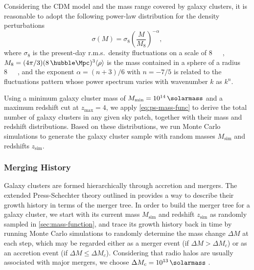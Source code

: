 \documentclass[modern]{aastex62}
\newcommand{\R}[1]{\mathrm{#1}}
\begin{document}
Considering the CDM model and the mass range covered by galaxy clusters,
it is reasonable to adopt the following power-law distribution for the
density perturbations \citep{sarazin2002,randall2002}
\begin{equation}
  \label{eq:sigma-mass}
  \sigma(M) = \sigma_8 \left( \frac{M}{M_8} \right)^{-\alpha},
\end{equation}
where $\sigma_8$ is the present-day r.m.s.\ density fluctuations on
a scale of \SI{8}{\per\hubble\Mpc},
$M_8 = (4\pi/3)(8 \,\si{\per\hubble\Mpc})^3 \langle{\rho}\rangle$
is the mass contained in a sphere of a radius \SI{8}{\per\hubble\Mpc},
and the exponent $\alpha = (n+3)/6$ with $n = -7/5$ \citep{randall2002}
is related to the fluctuations pattern whose power spectrum varies
with wavenumber $k$ as $k^n$.

Using a minimum galaxy cluster mass of
$M_{\R{min}} = \SI{e14}{\solarmass}$
and a maximum redshift cut at $z_{\R{max}} = 4$,
we apply \autoref{eq:ps-mass-func} to derive the total number of
galaxy clusters in any given sky patch, together with their mass and
redshift distributions.
Based on these distributions, we run Monte Carlo simulations to
generate the galaxy cluster sample with random masses
$M_{\R{sim}}$ and redshifts $z_{\R{sim}}$.

\subsubsection{Merging History}
\label{sec:merging-history}

Galaxy clusters are formed hierarchically through accretion and mergers.
The extended Press-Schechter theory outlined in \citet{lacey1993} provides
a way to describe their growth history in terms of the merger tree.
In order to build the merger tree for a galaxy cluster, we start with
its current mass $M_{\R{sim}}$ and redshift $z_{\R{sim}}$ as randomly sampled
in \autoref{sec:mass-function}, and trace its growth history back in time
by running Monte Carlo simulations to randomly determine the mass change
$\Delta M$ at each step, which may be regarded either as a merger event
(if $\Delta M > \Delta M_c$) or as an accretion event
(if $\Delta M \leq \Delta M_c$).
Considering that radio halos are usually associated with major mergers,
we choose $\Delta M_c = \SI{e13}{\solarmass}$ \citep[e.g.,][]{cassano2005}.
\end{document}
